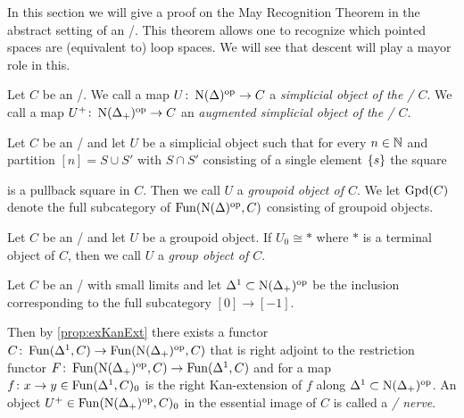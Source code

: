 In this section we will give a proof on the May Recognition Theorem in the abstract setting of an \inftytop/.
This theorem allows one to recognize which pointed spaces are (equivalent to) loop spaces.
We will see that descent will play a mayor role in this.
\begin{definition} %
    Let $C$ be an \inftycat/. 
    We call a map $U\colon\operatorname{N}(\Delta)^{\operatorname{op}}\to C$ a \emph{simplicial object of the \inftycat/ $C$}.
    We call a map $U^+\colon\operatorname{N}(\Delta_+)^{\operatorname{op}}\to C$ an \emph{augmented simplicial object of the \inftycat/ $C$}.
\end{definition}
\begin{definition}
    Let $C$ be an \inftycat/ and let $U$ be a simplicial object such that for every $n\in\mathbb{N}$ and partition $[n]=S\cup S'$ with $S\cap S'$ consisting of a single element $\left\lbrace s\right\rbrace$ the square
    \begin{center}
    \end{center}
    is a pullback square in $C$.
    Then we call $U$ a \emph{groupoid object of $C$}.
    We let $\operatorname{Gpd}(C)$ denote the full subcategory of $\operatorname{Fun}(\operatorname{N}(\Delta)^{\operatorname{op}},C)$ consisting of groupoid objects.
\end{definition}
\begin{definition}
    Let $C$ be an \inftycat/ and let $U$ be a groupoid object.
    If $U_0\cong *$ where $*$ is a terminal object of $C$, then we call $U$ a \emph{group object of $C$}.
\end{definition}
\begin{definition} %
    Let $C$ be an \inftycat/ with small limits and let $\Delta^1\subset\operatorname{N}(\Delta_+)^{\operatorname{op}}$ be the inclusion corresponding to the full subcategory $[0]\to[-1]$.
    
    Then by \cref{prop:exKanExt} there exists a functor $C\colon\operatorname{Fun}(\Delta^1,C)\to\operatorname{Fun}(\operatorname{N}(\Delta_+)^{\operatorname{op}},C)$ that is right adjoint to the restriction functor $F\colon\operatorname{Fun}(\operatorname{N}(\Delta_+)^{\operatorname{op}},C)\to\operatorname{Fun}(\Delta^1,C)$ and for a map $f\colon x\to y\in\operatorname{Fun}(\Delta^1,C)_0$ is the right Kan-extension of $f$ along $\Delta^1\subset\operatorname{N}(\Delta_+)^{\operatorname{op}}$.
    An object $U^+\in\operatorname{Fun}(\operatorname{N}(\Delta_+)^{\operatorname{op}},C)_0$ in the essential image of $C$ is called a \emph{\Cech/ nerve}.
\end{definition}
